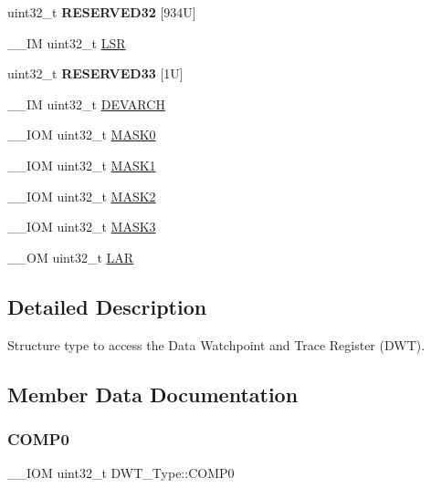 \begin{DoxyCompactItemize}
\item 
\mbox{\label{struct_d_w_t___type_ae115aa377666f6cab474d9a8bc0a00f2}} 
uint32\+\_\+t {\bfseries R\+E\+S\+E\+R\+V\+E\+D32} \mbox{[}934\+U\mbox{]}
\item 
\+\_\+\+\_\+\+IM uint32\+\_\+t \mbox{\hyperlink{struct_d_w_t___type_a4281befcc19ee69afdd50801cb1c9bcf}{L\+SR}}
\item 
\mbox{\label{struct_d_w_t___type_a23488c27be43c80c8c1dfd17aac9c28d}} 
uint32\+\_\+t {\bfseries R\+E\+S\+E\+R\+V\+E\+D33} \mbox{[}1\+U\mbox{]}
\item 
\+\_\+\+\_\+\+IM uint32\+\_\+t \mbox{\hyperlink{struct_d_w_t___type_ae60dbff3143d15cd04ac984084d8fbc7}{D\+E\+V\+A\+R\+CH}}
\item 
\+\_\+\+\_\+\+I\+OM uint32\+\_\+t \mbox{\hyperlink{struct_d_w_t___type_a821eb5e71f340ec077efc064cfc567db}{M\+A\+S\+K0}}
\item 
\+\_\+\+\_\+\+I\+OM uint32\+\_\+t \mbox{\hyperlink{struct_d_w_t___type_aabf94936c9340e62fed836dcfb152405}{M\+A\+S\+K1}}
\item 
\+\_\+\+\_\+\+I\+OM uint32\+\_\+t \mbox{\hyperlink{struct_d_w_t___type_a00ac4d830dfe0070a656cda9baed170f}{M\+A\+S\+K2}}
\item 
\+\_\+\+\_\+\+I\+OM uint32\+\_\+t \mbox{\hyperlink{struct_d_w_t___type_a2a509d8505c37a3b64f6b24993df5f3f}{M\+A\+S\+K3}}
\item 
\+\_\+\+\_\+\+OM uint32\+\_\+t \mbox{\hyperlink{struct_d_w_t___type_a4b8037802a3b25e367f0977d86f754ad}{L\+AR}}
\end{DoxyCompactItemize}


\subsection{Detailed Description}
Structure type to access the Data Watchpoint and Trace Register (D\+WT). 

\subsection{Member Data Documentation}
\mbox{\label{struct_d_w_t___type_a61c2965af5bc0643f9af65620b0e67c9}} 
\subsubsection{\texorpdfstring{COMP0}{COMP0}}
{\footnotesize\ttfamily \+\_\+\+\_\+\+I\+OM uint32\+\_\+t D\+W\+T\+\_\+\+Type\+::\+C\+O\+M\+P0}

